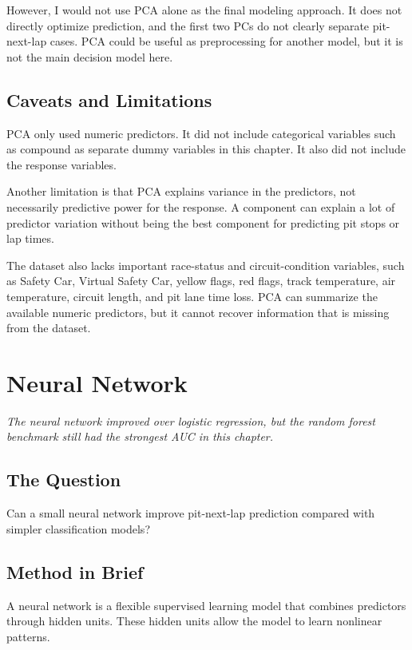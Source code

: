 \documentclass[11pt,oneside,openany]{book}
\newcommand{\chapterquote}[1]{%
\begin{center}
\small\textit{#1}
\end{center}
\vspace{-0.5em}
}
\begin{document}
However, I would not use PCA alone as the final modeling approach. It does not directly optimize prediction, and the first two PCs do not clearly separate pit-next-lap cases. PCA could be useful as preprocessing for another model, but it is not the main decision model here.

\section{Caveats and Limitations}

PCA only used numeric predictors. It did not include categorical variables such as compound as separate dummy variables in this chapter. It also did not include the response variables.

Another limitation is that PCA explains variance in the predictors, not necessarily predictive power for the response. A component can explain a lot of predictor variation without being the best component for predicting pit stops or lap times.

The dataset also lacks important race-status and circuit-condition variables, such as Safety Car, Virtual Safety Car, yellow flags, red flags, track temperature, air temperature, circuit length, and pit lane time loss. PCA can summarize the available numeric predictors, but it cannot recover information that is missing from the dataset.


\chapter{Neural Network}
\chapterquote{The neural network improved over logistic regression, but the random forest benchmark still had the strongest AUC in this chapter.}

\section{The Question}

Can a small neural network improve pit-next-lap prediction compared with simpler classification models?

\section{Method in Brief}

A neural network is a flexible supervised learning model that combines predictors through hidden units. These hidden units allow the model to learn nonlinear patterns.
\end{document}
